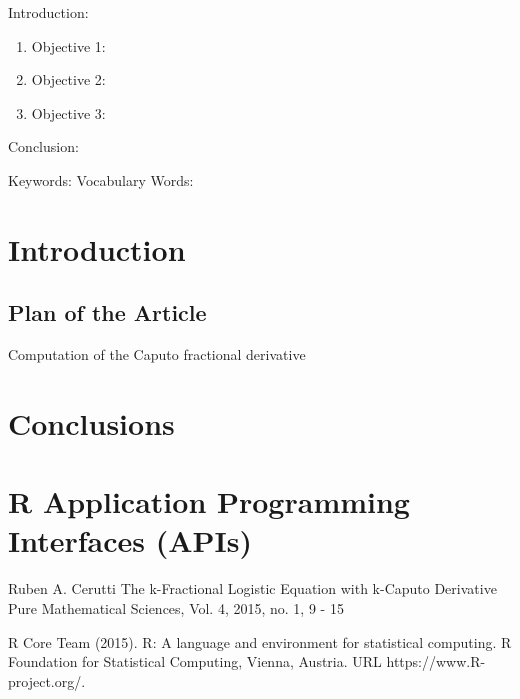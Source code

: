 

\twocolumn
\scriptsize
\begin{frontmatter}
		\title{}
		\author{}
		\address{The Mathematical Learning Space}
\end{frontmatter}	

Introduction:
\begin{enumerate}
\item Objective 1:
\item Objective 2:
\item Objective 3:
\end{enumerate}
Conclusion:

Keywords:
Vocabulary Words:

\section{Introduction}

\subsection{Plan of the Article}


\begin{algorithm}[H]
\footnotesize
\begin{algorithmic}[1]

\end{algorithmic}
\caption{Computation of the Caputo fractional derivative}
	\label{Algorithm_1}
\end{algorithm}

\section{Conclusions}


\section{R Application Programming Interfaces (APIs)}





\begin{thebibliography}{00}


 Ruben A. Cerutti
\newblock The k-Fractional Logistic Equation with k-Caputo Derivative
\newblock Pure Mathematical Sciences, Vol.  4, 2015, no.  1, 9 - 15


R Core Team (2015). 
\newblock R: A language and environment for statistical computing. R Foundation for Statistical Computing, Vienna, Austria.
\newblock URL https://www.R-project.org/.

\end{thebibliography}

